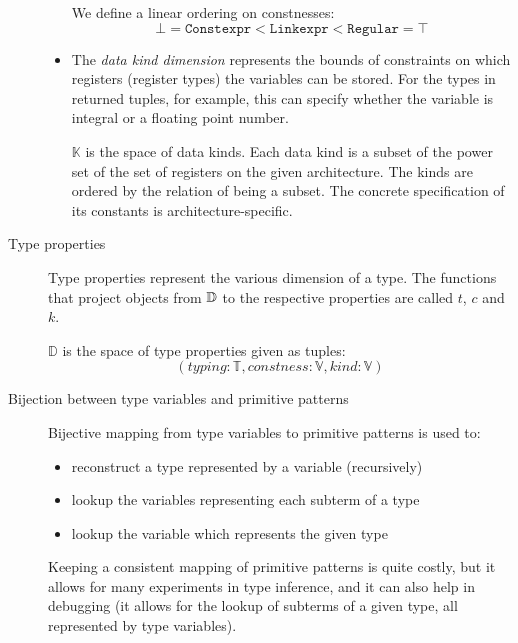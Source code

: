 \begin{description}
\begin{itemize}
\begin{center}\begin{grammar}
\end{grammar}\end{center}

        We define a linear ordering on constnesses:
        $$\bot = \mathtt{Constexpr} < \mathtt{Linkexpr} < \mathtt{Regular} = \top$$

        \item The \emph{data kind dimension} represents the bounds of constraints on which registers (register types) the variables can be stored. For the types in returned tuples, for example, this can specify whether the variable is integral or a floating point number.

        $\mathbb{K}$ is the space of data kinds. Each data kind is a subset of the power set of the set of registers on the given architecture. The kinds are ordered by the relation of being a subset. The concrete specification of its constants is architecture-specific.
    \end{itemize}

    \item[Type properties] Type properties represent the various dimension of a type. The functions that project objects from $\mathbb{D}$ to the respective properties are called $t$, $c$ and $k$.

    $\mathbb{D}$ is the space of type properties given as tuples:
    $$(typing: \mathbb{T}, constness: \mathbb{V}, kind: \mathbb{V})$$


    \item[Bijection between type variables and primitive patterns]
    Bijective mapping from type variables to primitive patterns is used to:

    \begin{itemize}
        \item reconstruct a type represented by a variable (recursively)
        \item lookup the variables representing each subterm of a type
        \item lookup the variable which represents the given type
    \end{itemize}

    Keeping a consistent mapping of primitive patterns is quite costly, but it allows for many experiments in type inference, and it can also help in debugging (it allows for the lookup of subterms of a given type, all represented by type variables).
\end{description}


